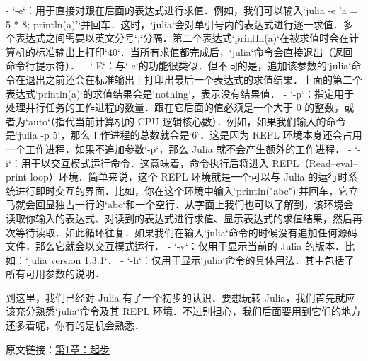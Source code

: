 - `-e`：用于直接对跟在后面的表达式进行求值．例如，我们可以输入`julia -e 'a = 5 * 8; println(a)'`并回车．这时，`julia`会对单引号内的表达式进行逐一求值．多个表达式之间需要以英文分号`;`分隔．第二个表达式`println(a)`在被求值时会在计算机的标准输出上打印`40`．当所有求值都完成后，`julia`命令会直接退出（返回命令行提示符）．
- `-E`：与`-e`的功能很类似．但不同的是，追加该参数的`julia`命令在退出之前还会在标准输出上打印出最后一个表达式的求值结果．上面的第二个表达式`println(a)`的求值结果会是`nothing`，表示没有结果值．
- `-p`：指定用于处理并行任务的工作进程的数量．跟在它后面的值必须是一个大于 0 的整数，或者为`auto`（指代当前计算机的 CPU 逻辑核心数）．例如，如果我们输入的命令是`julia -p 5`，那么工作进程的总数就会是`6`．这是因为 REPL 环境本身还会占用一个工作进程．如果不追加参数`-p`，那么 Julia 就不会产生额外的工作进程．
- `-i`：用于以交互模式运行命令．这意味着，命令执行后将进入 REPL（Read–eval–print loop）环境．简单来说，这个 REPL 环境就是一个可以与 Julia 的运行时系统进行即时交互的界面．比如，你在这个环境中输入`println("abc")`并回车，它立马就会回显独占一行的`abc`和一个空行．从字面上我们也可以了解到，该环境会读取你输入的表达式、对读到的表达式进行求值、显示表达式的求值结果，然后再次等待读取．如此循环往复．如果我们在输入`julia`命令的时候没有追加任何源码文件，那么它就会以交互模式运行．
- `-v`：仅用于显示当前的 Julia 的版本．比如：`julia version 1.3.1`．
- `-h`：仅用于显示`julia`命令的具体用法．其中包括了所有可用参数的说明．

到这里，我们已经对 Julia 有了一个初步的认识．要想玩转 Julia，我们首先就应该充分熟悉`julia`命令及其 REPL 环境．不过别担心，我们后面要用到它们的地方还多着呢，你有的是机会熟悉．

原文链接：\href{https://github.com/hyper0x/JuliaBasics/blob/master/book/ch01.md}{第1章：起步}